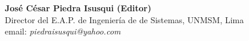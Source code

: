 \begin{center}
\textbf{José César Piedra Isusqui (Editor)}\\
Director del E.A.P. de Ingeniería de de Sistemas, UNMSM, Lima\\
email: \textit{piedraisusqui@yahoo.com}
\end{center}
